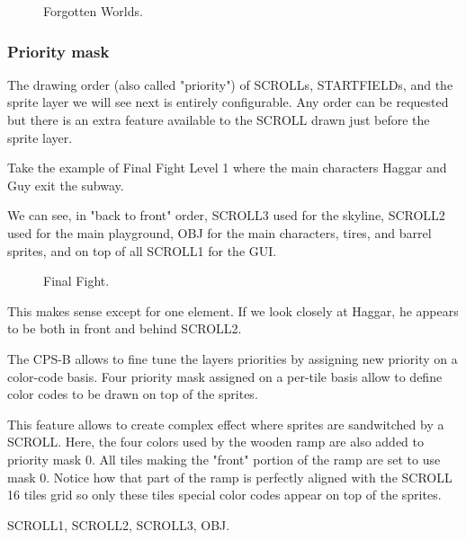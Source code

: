 \vfill
\begin{figure}[!b]
 \caption*{Forgotten Worlds.}%
 \end{figure}%
\pagebreak









\subsubsection{Priority mask}


The drawing order (also called "priority") of SCROLLs, STARTFIELDs, and the sprite layer we will see next is entirely configurable. Any order can be requested but there is an extra feature available to the SCROLL drawn just before the sprite layer.

Take the example of Final Fight Level 1 where the main characters Haggar and Guy exit the subway. 

We can see, in "back to front" order,   SCROLL3 used for the skyline,  SCROLL2 used for the main playground,  OBJ for the main characters, tires, and barrel sprites, and on top of all  SCROLL1 for the GUI.


\vfill
\begin{figure}[!b]
 \caption*{Final Fight.}%
 \end{figure}%
\pagebreak


This makes sense except for one element. If we look closely at Haggar, he appears to be both in front and behind SCROLL2.

The CPS-B allows to fine tune the layers priorities by assigning new priority on a color-code basis. Four priority mask assigned on a per-tile basis allow to define color codes to be drawn on top of the sprites. 

This feature allows to create complex effect where sprites are sandwitched by a SCROLL. Here, the four colors used by the wooden ramp are also added to priority mask 0. All tiles making the "front" portion of the ramp are set to use mask 0. Notice how that part of the ramp is perfectly aligned with the SCROLL 16 tiles grid so only these tiles special color codes appear on top of the sprites.

 SCROLL1,  SCROLL2,  SCROLL3,  OBJ.

